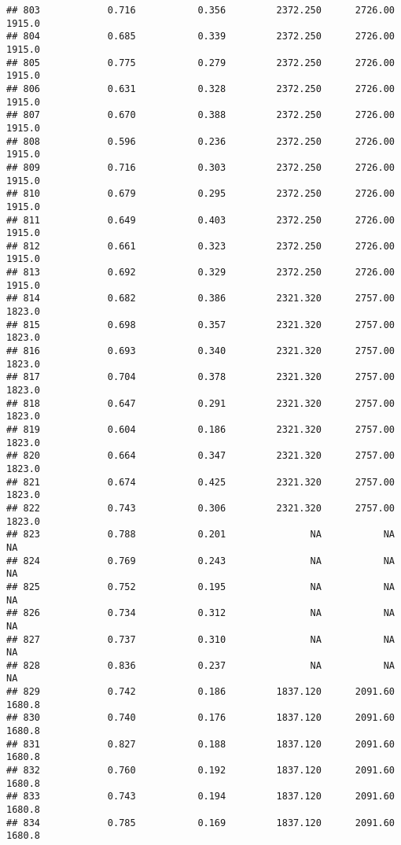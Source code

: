 \documentclass[
]{article}
\begin{document}
\begin{verbatim}
## 803            0.716           0.356         2372.250      2726.00       1915.0
## 804            0.685           0.339         2372.250      2726.00       1915.0
## 805            0.775           0.279         2372.250      2726.00       1915.0
## 806            0.631           0.328         2372.250      2726.00       1915.0
## 807            0.670           0.388         2372.250      2726.00       1915.0
## 808            0.596           0.236         2372.250      2726.00       1915.0
## 809            0.716           0.303         2372.250      2726.00       1915.0
## 810            0.679           0.295         2372.250      2726.00       1915.0
## 811            0.649           0.403         2372.250      2726.00       1915.0
## 812            0.661           0.323         2372.250      2726.00       1915.0
## 813            0.692           0.329         2372.250      2726.00       1915.0
## 814            0.682           0.386         2321.320      2757.00       1823.0
## 815            0.698           0.357         2321.320      2757.00       1823.0
## 816            0.693           0.340         2321.320      2757.00       1823.0
## 817            0.704           0.378         2321.320      2757.00       1823.0
## 818            0.647           0.291         2321.320      2757.00       1823.0
## 819            0.604           0.186         2321.320      2757.00       1823.0
## 820            0.664           0.347         2321.320      2757.00       1823.0
## 821            0.674           0.425         2321.320      2757.00       1823.0
## 822            0.743           0.306         2321.320      2757.00       1823.0
## 823            0.788           0.201               NA           NA           NA
## 824            0.769           0.243               NA           NA           NA
## 825            0.752           0.195               NA           NA           NA
## 826            0.734           0.312               NA           NA           NA
## 827            0.737           0.310               NA           NA           NA
## 828            0.836           0.237               NA           NA           NA
## 829            0.742           0.186         1837.120      2091.60       1680.8
## 830            0.740           0.176         1837.120      2091.60       1680.8
## 831            0.827           0.188         1837.120      2091.60       1680.8
## 832            0.760           0.192         1837.120      2091.60       1680.8
## 833            0.743           0.194         1837.120      2091.60       1680.8
## 834            0.785           0.169         1837.120      2091.60       1680.8

\end{verbatim}
\end{document}
